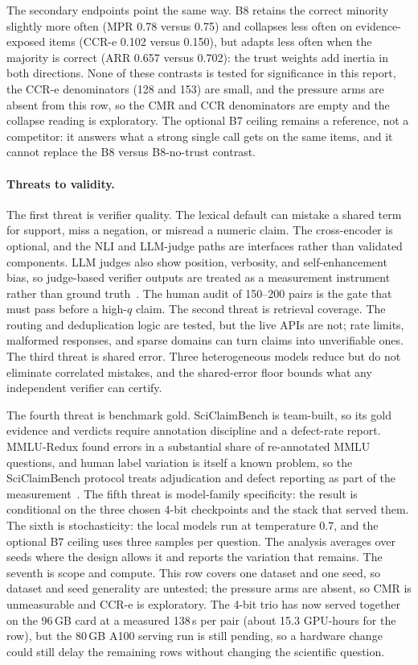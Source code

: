 The secondary endpoints point the same way. B8 retains the correct minority slightly more often (MPR 0.78 versus 0.75) and collapses less often on evidence-exposed items (CCR-e 0.102 versus 0.150), but adapts less often when the majority is correct (ARR 0.657 versus 0.702): the trust weights add inertia in both directions. None of these contrasts is tested for significance in this report, the CCR-e denominators (128 and 153) are small, and the pressure arms are absent from this row, so the CMR and CCR denominators are empty and the collapse reading is exploratory. The optional B7 ceiling remains a reference, not a competitor: it answers what a strong single call gets on the same items, and it cannot replace the B8 versus B8-no-trust contrast.

\paragraph*{Threats to validity.}
The first threat is verifier quality. The lexical default can mistake a shared term for support, miss a negation, or misread a numeric claim. The cross-encoder is optional, and the NLI and LLM-judge paths are interfaces rather than validated components. LLM judges also show position, verbosity, and self-enhancement bias, so judge-based verifier outputs are treated as a measurement instrument rather than ground truth~\cite{zheng2023judging,wang2024large}. The human audit of 150--200 pairs is the gate that must pass before a high-$q$ claim. The second threat is retrieval coverage. The routing and deduplication logic are tested, but the live APIs are not; rate limits, malformed responses, and sparse domains can turn claims into unverifiable ones. The third threat is shared error. Three heterogeneous models reduce but do not eliminate correlated mistakes, and the shared-error floor bounds what any independent verifier can certify.

The fourth threat is benchmark gold. SciClaimBench is team-built, so its gold evidence and verdicts require annotation discipline and a defect-rate report. MMLU-Redux found errors in a substantial share of re-annotated MMLU questions, and human label variation is itself a known problem, so the SciClaimBench protocol treats adjudication and defect reporting as part of the measurement~\cite{gema2025mmulredux,plank2022labelvariation}. The fifth threat is model-family specificity: the result is conditional on the three chosen 4-bit checkpoints and the stack that served them. The sixth is stochasticity: the local models run at temperature 0.7, and the optional B7 ceiling uses three samples per question. The analysis averages over seeds where the design allows it and reports the variation that remains. The seventh is scope and compute. This row covers one dataset and one seed, so dataset and seed generality are untested; the pressure arms are absent, so CMR is unmeasurable and CCR-e is exploratory. The 4-bit trio has now served together on the 96\,GB card at a measured 138\,s per pair (about 15.3 GPU-hours for the row), but the 80\,GB A100 serving run is still pending, so a hardware change could still delay the remaining rows without changing the scientific question.

